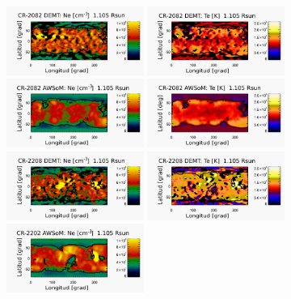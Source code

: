 \documentclass[baaa]{baaa}
\begin{document}
\begin{figure}[h!]
  \centering
  \includegraphics[width=0.4\textwidth]{figuras/map_Ne_CR2082_DEMT-EUVI_behind_H1-L3523_r3d_1105_Rsun_2.pdf}
  \includegraphics[width=0.4\textwidth]{figuras/map_Tm_CR2082_DEMT-EUVI_behind_H1-L3523_r3d_1105_Rsun_2.pdf}
  \includegraphics[width=0.4\textwidth]{figuras/map_Ne_awsom_2082_185_short_1105_Rsun_2.pdf}
  \includegraphics[width=0.4\textwidth]{figuras/map_Te_awsom_2082_185_short_1105_Rsun_2.pdf}
  \includegraphics[width=0.4\textwidth]{figuras/map_Ne_CR2208_DEMT-AIA_H1_L522_r3d_1105_Rsun_2.pdf}
  \includegraphics[width=0.4\textwidth]{figuras/map_Tm_CR2208_DEMT-AIA_H1_L522_r3d_1105_Rsun_2.pdf}  
  \includegraphics[width=0.4\textwidth]{figuras/map_Ne_awsom_2208_185_short_1105_Rsun_2.pdf}

\end{figure}
\end{document}
